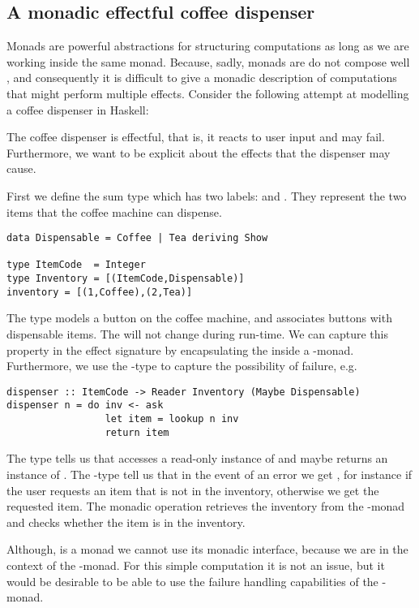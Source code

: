 \subsection{A monadic effectful coffee dispenser}\label{sec:problem-with-monads}
Monads are powerful abstractions for structuring computations as long as we are working inside the same monad. 
Because, sadly, monads are do not compose well \cite{Kammar2013}, and consequently it is difficult to give a monadic description of computations that might perform multiple effects.
Consider the following attempt at modelling a coffee dispenser in Haskell:
\begin{example}\label{ex:coffee1}
The coffee dispenser is effectful, that is, it reacts to user input and may fail. Furthermore, we want to be explicit about the effects that the dispenser may cause. 

First we define the sum type  which has two labels:  and . They represent the two items that the coffee machine can dispense.
\begin{lstlisting}[style={haskell}]
data Dispensable = Coffee | Tea deriving Show

type ItemCode  = Integer
type Inventory = [(ItemCode,Dispensable)]
inventory = [(1,Coffee),(2,Tea)]
\end{lstlisting}
The  type models a button on the coffee machine, and  associates buttons with dispensable items. The  will not change during run-time. We can capture this property in the effect signature by encapsulating the  inside a -monad. Furthermore, we use the -type to capture the possibility of failure, e.g.
\begin{lstlisting}[style={haskell}]
dispenser :: ItemCode -> Reader Inventory (Maybe Dispensable)
dispenser n = do inv <- ask
                 let item = lookup n inv
                 return item
\end{lstlisting}
The type  tells us that  accesses a read-only instance of  and maybe returns an instance of . The -type tell us that in the event of an error we get , for instance if the user requests an item that is not in the inventory, otherwise we get  the requested item.
The monadic operation  retrieves the inventory from the -monad and  checks whether the item  is in the inventory.  

Although,  is a monad we cannot use its monadic interface, because we are in the context of the -monad. For this simple computation it is not an issue, but it would be desirable to be able to use the failure handling capabilities of the -monad.
\end{example}
